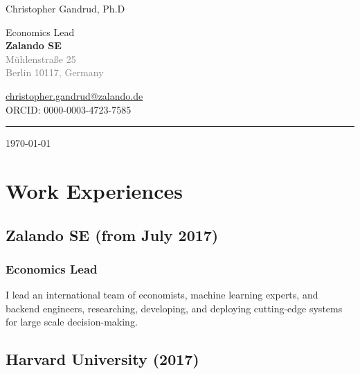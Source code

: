 \documentclass[a4paper]{article}
\begin{document}
    \begin{flushright}
	    {\huge{Christopher Gandrud, Ph.D}} \\
        \vspace{0.25cm}

        Economics Lead \\
        {\bf{\large{Zalando SE}}} \\
        \textcolor{gray}{M\"{u}hlenstra{\ss}e 25\\
        Berlin 10117, Germany} \\
        \vspace{0.25cm}

        \href{mailto:christopher.gandrud@zalando.de}{christopher.gandrud@zalando.de}\\[0.25cm]

        ORCID: 0000-0003-4723-7585\\[0.25cm]

        \medskip\hrule height 1pt

        \vspace{0.5cm}

        \today

    \end{flushright}



\vspace{0.5cm}

\section*{Work Experiences}

\subsection*{Zalando SE (from July 2017)}

\subsubsection*{Economics Lead}

I lead an international team of economists, machine learning experts, and backend engineers, researching, developing, and deploying  cutting-edge systems for large scale decision-making.

\subsection*{Harvard University (2017)}
\end{document}

